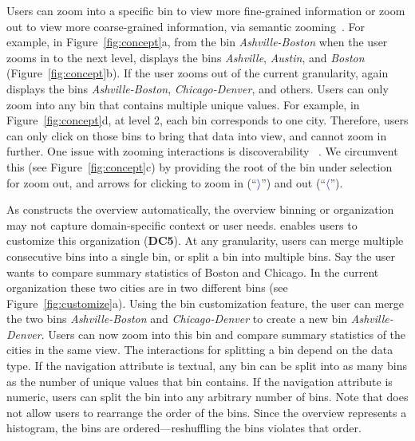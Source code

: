 Users can zoom into a specific bin
to view more fine-grained information or zoom out
to view more coarse-grained information,
via semantic zooming~\cite{perlin1993pad}.
For example, in Figure~\ref{fig:concept}a,
from the bin \emph{Ashville-Boston}
when the user zooms in to the next level,
\noah displays the bins \emph{Ashville}, \emph{Austin},
and \emph{Boston} (Figure~\ref{fig:concept}b).
If the user zooms out of the current granularity, again \noah displays the bins \emph{Ashville-Boston}, \emph{Chicago-Denver}, and others.
Users can only zoom into any bin that
contains multiple unique values.
For example, in Figure~\ref{fig:concept}d, at level 2,
each bin corresponds to one city.
Therefore, users can only click on those bins
to bring that data into view, and cannot zoom in further.
One issue with zooming interactions
is discoverability ~\cite{cockburn2009review}.
We circumvent this (see Figure~\ref{fig:concept}c)
by providing the root of the bin under selection
for zoom out, and arrows for
clicking to zoom in (``\textcolor{blue}{$\rangle$}'') and out (``\textcolor{blue}{$\langle$}'').

As \noah constructs the overview automatically,
the overview binning or organization
may not capture domain-specific context
or user needs.
\noah enables users to customize this organization (\textbf{DC5}).
At any granularity, users can merge multiple consecutive bins
into a single bin, or split a bin into multiple bins.
Say the user wants to compare summary statistics
of Boston and Chicago.
In the current organization
these two cities are  
in two different bins (see Figure~\ref{fig:customize}a).
Using the bin customization feature,
the user can merge the two bins
\emph{Ashville-Boston} and \emph{Chicago-Denver} to create a new bin \emph{Ashville-Denver}.
Users can now zoom into this bin and
compare summary statistics of the cities in the same view.
The interactions for splitting a
bin depend on the data type.
If the navigation attribute is textual,
any bin can be split into as many bins as the
number of unique values that bin contains.
If the navigation attribute is numeric,
users can split the bin into any arbitrary number of bins.
Note that \noah does not allow users to rearrange the
order of the bins. Since the overview represents a histogram, the bins are ordered---reshuffling the bins violates that order.

